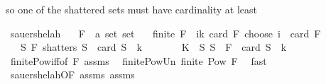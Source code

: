 \begin{isabellebody}
\begin{isamarkuptext}
      so one of the shattered sets must have cardinality at least %
\end{isamarkuptext}\isamarkuptrue%
\isamarkupfalse%
\ sauer{\isacharunderscore}{\kern0pt}shelah{\isacharcolon}{\kern0pt}\isanewline
\ \ \ F\ {\isacharcolon}{\kern0pt}{\isacharcolon}{\kern0pt}\ {\isachardoublequoteopen}{\isacharprime}{\kern0pt}a\ set\ set{\isachardoublequoteclose}\isanewline
\ \ \ {\isachardoublequoteopen}finite\ {\isacharparenleft}{\kern0pt}{\isasymUnion}F{\isacharparenright}{\kern0pt}{\isachardoublequoteclose}\ \ {\isachardoublequoteopen}{\isacharparenleft}{\kern0pt}{\isasymSum}i{\isasymle}k{\isachardot}{\kern0pt}\ card\ {\isacharparenleft}{\kern0pt}{\isasymUnion}F{\isacharparenright}{\kern0pt}\ choose\ i{\isacharparenright}{\kern0pt}\ {\isacharless}{\kern0pt}\ card\ F{\isachardoublequoteclose}\isanewline
\ \ \ {\isachardoublequoteopen}{\isasymexists}S{\isachardot}{\kern0pt}\ {\isacharparenleft}{\kern0pt}F\ shatters\ S\ {\isasymand}\ card\ S\ {\isacharequal}{\kern0pt}\ k\ {\isacharplus}{\kern0pt}\ {}{\isacharparenright}{\kern0pt}{\isachardoublequoteclose}\isanewline
%
\isadelimproof
%
\endisadelimproof
%
\isatagproof
{}\isamarkupfalse%
\ {\isacharminus}{\kern0pt}\isanewline
\ \ \isamarkupfalse%
\ {\isacharquery}{\kern0pt}K\ {\isacharequal}{\kern0pt}\ {\isachardoublequoteopen}{\isacharbraceleft}{\kern0pt}S{\isachardot}{\kern0pt}\ S\ {\isasymsubseteq}\ {\isasymUnion}F\ {\isasymand}\ card\ S\ {\isasymle}\ k{\isacharbraceright}{\kern0pt}{\isachardoublequoteclose}\isanewline
\ \ \isamarkupfalse%
\ finite{\isacharunderscore}{\kern0pt}Pow{\isacharunderscore}{\kern0pt}iff{\isacharbrackleft}{\kern0pt}of\ F{\isacharbrackright}{\kern0pt}\ assms{\isacharparenleft}{\kern0pt}{}{\isacharparenright}{\kern0pt}\ \isamarkupfalse%
\ finite{\isacharunderscore}{\kern0pt}Pow{\isacharunderscore}{\kern0pt}Un{\isacharcolon}{\kern0pt}\ {\isachardoublequoteopen}finite\ {\isacharparenleft}{\kern0pt}Pow\ {\isacharparenleft}{\kern0pt}{\isasymUnion}F{\isacharparenright}{\kern0pt}{\isacharparenright}{\kern0pt}{\isachardoublequoteclose}\ \isamarkupfalse%
\ fast\isanewline
\isanewline
\ \ \isamarkupfalse%
\ sauer{\isacharunderscore}{\kern0pt}shelah{\isacharunderscore}{\kern0pt}{}{\isacharbrackleft}{\kern0pt}OF\ assms{\isacharparenleft}{\kern0pt}{}{\isacharparenright}{\kern0pt}{\isacharbrackright}{\kern0pt}\ assms{\isacharparenleft}{\kern0pt}{}{\isacharparenright}{\kern0pt}\ \isamarkupfalse%

\end{isabellebody}

